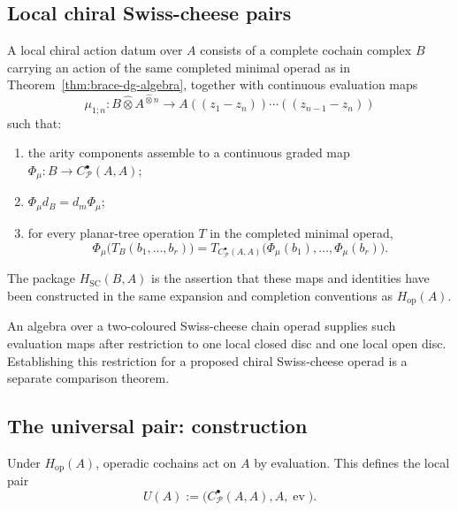 \subsection{Local chiral Swiss-cheese pairs}
\label{subsec:local-swiss-cheese}

\begin{definition}
\label{def:local-swiss-cheese-pair}
A local chiral action datum over \(A\) consists of a complete cochain
complex \(B\) carrying an action of the same completed minimal operad
as in Theorem~\ref{thm:brace-dg-algebra}, together with continuous
evaluation maps
\[
 \mu_{1;n}\colon B\widehat\otimes A^{\widehat\otimes n}
 \longrightarrow A((z_1-z_n))\cdots((z_{n-1}-z_n))
\]
such that:
\begin{enumerate}[label=\textup{(\roman*)}]
\item the arity components assemble to a continuous graded map
 \(\Phi_\mu\colon B\to C^\bullet_{\mathcal P}(A,A)\);
\item \(\Phi_\mu d_B=d_m\Phi_\mu\);
\item for every planar-tree operation \(T\) in the completed minimal
operad,
 \[
 \Phi_\mu\bigl(T_B(b_1,\ldots,b_r)\bigr)
 =
 T_{C^\bullet_{\mathcal P}(A,A)}\bigl(
 \Phi_\mu(b_1),\ldots,\Phi_\mu(b_r)\bigr).
 \]
\end{enumerate}
The package \(H_{\mathrm{SC}}(B,A)\) is the assertion that these maps
and identities have been constructed in the same expansion and
completion conventions as \(H_{\mathrm{op}}(A)\).
\end{definition}

\begin{remark}
\label{rem:swiss-cheese-operad}
An algebra over a two-coloured Swiss-cheese chain operad supplies such
evaluation maps after restriction to one local closed disc and one
local open disc.  Establishing this restriction for a proposed chiral
Swiss-cheese operad is a separate comparison theorem.
\end{remark}

\subsection{The universal pair: construction}
\label{subsec:universal-pair-construction}

\begin{construction}
\label{const:universal-pair}
Under \(H_{\mathrm{op}}(A)\), operadic cochains act on \(A\) by
evaluation.  This defines the local pair
\[
 U(A):=\bigl(C^\bullet_{\mathcal P}(A,A),A,\operatorname{ev}\bigr).
\]
\end{construction}

